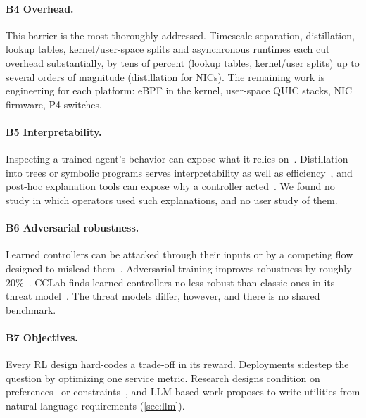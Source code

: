 \paragraph{B4 Overhead.} This barrier is the most thoroughly addressed. Timescale separation, distillation, lookup tables, kernel/user-space splits and asynchronous runtimes each cut overhead substantially, by tens of percent (lookup tables, kernel/user splits) up to several orders of magnitude (distillation for NICs). The remaining work is engineering for each platform: eBPF in the kernel, user-space QUIC stacks, NIC firmware, P4 switches.

\paragraph{B5 Interpretability.} Inspecting a trained agent's behavior can expose what it relies on~\cite{dethise2019cracking}. Distillation into trees or symbolic programs serves interpretability as well as efficiency~\cite{meng2020interpreting,sharan2022symbolic,martins2024closed,gu2025procc}, and post-hoc explanation tools can expose why a controller acted~\cite{patel2024crystalbox,patel2025agua}. We found no study in which operators used such explanations, and no user study of them.

\paragraph{B6 Adversarial robustness.} Learned controllers can be attacked through their inputs or by a competing flow designed to mislead them~\cite{yang2022good,chen2025exploring}. Adversarial training improves robustness by roughly 20\%~\cite{chen2025exploring}. CCLab finds learned controllers no less robust than classic ones in its threat model~\cite{chen2026cclab}. The threat models differ, however, and there is no shared benchmark.

\paragraph{B7 Objectives.} Every RL design hard-codes a trade-off in its reward. Deployments sidestep the question by optimizing one service metric. Research designs condition on preferences~\cite{ma2022mocc} or constraints~\cite{liu2021multi}, and LLM-based work proposes to write utilities from natural-language requirements (\cref{sec:llm}).

